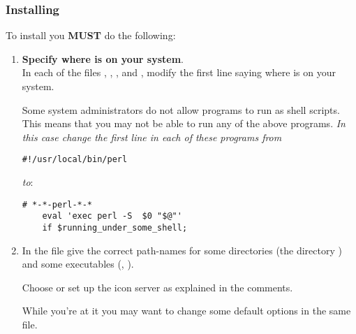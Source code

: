 \subsubsection{Installing \protect\latextohtml}%
\html{\\}%
To install \latextohtml{} you \textbf{MUST} do the following:
%
\begin{enumerate}
\item
\textbf{Specify where \Perl{} is on your system}. \\
In each of the files , , ,
 and ,
modify the first line saying where \Perl{} is on your system.


\noindent
Some system administrators do not allow \Perl{} programs to run as shell scripts.
This means that you may not be able to run any of the above programs.
\emph{In this case change the first line in each of these programs from }
\html{\smallskip}
\begin{small}
\verb|#!/usr/local/bin/perl |
\end{small}
\html{\smallskip}\emph{to}:
\begin{small}
\begin{verbatim}
# *-*-perl-*-*
    eval 'exec perl -S  $0 "$@"'
    if $running_under_some_shell;
\end{verbatim}
\end{small}

%
\item
In the file  give the correct path-names for
some directories (the  directory )
and some executables (, ).

Choose or set up the icon server as explained in the comments.


While you're at it you may want to change some default
options in the same file.


\end{enumerate}
